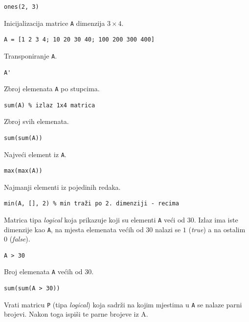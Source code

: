 \documentclass[a4paper, 10pt]{article}
\newcommand{\spec}[1]{\texttt{#1}} %
\newcommand{\eng}[1]{\emph{#1}} %
\begin{document}
\begin{lstlisting}
ones(2, 3)
\end{lstlisting}

Inicijalizacija matrice \spec{A} dimenzija $3 \times 4$.

\begin{lstlisting}
A = [1 2 3 4; 10 20 30 40; 100 200 300 400]
\end{lstlisting}

\pagebreak %

Transponiranje \spec{A}.
\begin{lstlisting}
A'
\end{lstlisting}

Zbroj elemenata \spec{A} po stupcima.

\begin{lstlisting}
sum(A) % izlaz 1x4 matrica
\end{lstlisting}

Zbroj svih elemenata.

\begin{lstlisting}
sum(sum(A))
\end{lstlisting}

Najveći element iz \spec{A}.

\begin{lstlisting}
max(max(A))
\end{lstlisting}

Najmanji elementi iz pojedinih redaka.

\begin{lstlisting}
min(A, [], 2) % min traži po 2. dimenziji - recima
\end{lstlisting}

Matrica tipa \eng{logical} koja prikazuje koji su elementi \spec{A} veći od $30$.
Izlaz ima iste dimenzije kao \spec{A}, na mjesta elemenata većih od $30$ nalazi se $1$ (\eng{true}) a na ostalim $0$ (\eng{false}).

\begin{lstlisting}
A > 30
\end{lstlisting}

Broj elemenata \spec{A} većih od $30$.

\begin{lstlisting}
sum(sum(A > 30))
\end{lstlisting}

Vrati matricu \spec{P} (tipa \eng{logical}) koja sadrži na kojim mjestima u \spec{A} se nalaze parni brojevi.
Nakon toga ispiši te parne brojeve iz {A}.
\end{document}
